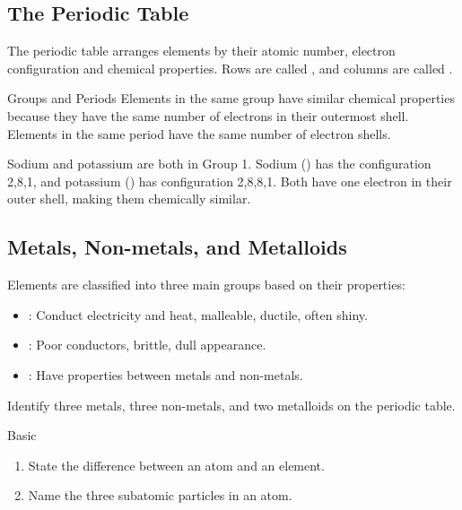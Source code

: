 
\subsection{The Periodic Table}

The periodic table arranges elements by their atomic number, electron configuration and chemical properties. Rows are called , and columns are called .

\begin{keyconcept}{Groups and Periods}
Elements in the same group have similar chemical properties because they have the same number of electrons in their outermost shell. Elements in the same period have the same number of electron shells.
\end{keyconcept}

\begin{example}
Sodium and potassium are both in Group 1. Sodium () has the configuration 2,8,1, and potassium () has configuration 2,8,8,1. Both have one electron in their outer shell, making them chemically similar.
\end{example}

\subsection{Metals, Non-metals, and Metalloids}

Elements are classified into three main groups based on their properties:
\begin{itemize}
    \item {}: Conduct electricity and heat, malleable, ductile, often shiny.
    \item {}: Poor conductors, brittle, dull appearance.
    \item {}: Have properties between metals and non-metals.
\end{itemize}

\begin{stopandthink}
Identify three metals, three non-metals, and two metalloids on the periodic table.
\end{stopandthink}

\begin{tieredquestions}{Basic}
\begin{enumerate}
    \item State the difference between an atom and an element.
    \item Name the three subatomic particles in an atom.
\end{enumerate}
\end{tieredquestions}


